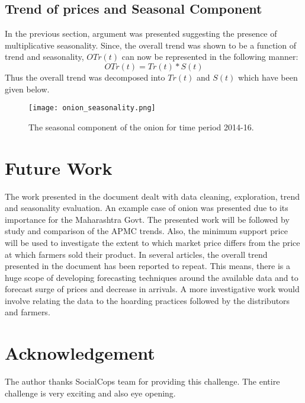 \documentclass{article}
\begin{document}
\subsection{Trend of prices and Seasonal Component}
In the previous section, argument was presented suggesting the presence of multiplicative seasonality. Since, the overall trend was shown to be a function of trend and seasonality, $OTr(t)$ can now be represented in the following manner:
\begin{equation}
	OTr(t) = Tr(t)*S(t)
\end{equation}
Thus the overall trend was decomposed into $Tr(t)$ and $S(t)$ which have been given below.

\begin{figure}

	\texttt{[image: onion\_seasonality.png]}
	\caption{The seasonal component of the onion for time period 2014-16. }
	\label{fig:onionseasonal}
\end{figure}
\section{Future Work}
The work presented in the document dealt with data cleaning, exploration, trend and seasonality evaluation. An example case of onion was presented due to its importance for the Maharashtra Govt. The presented work will be followed by study and comparison of the APMC trends. Also, the minimum support price will be used to investigate the extent to which market price differs from the price at which farmers sold their product. In several articles, the overall trend presented in the document has been reported to repeat. This means, there is a huge scope of developing forecasting techniques around the available data and to forecast surge of prices and decrease in arrivals. A more investigative work would involve relating the data to the hoarding practices followed by the distributors and farmers. 
\section{Acknowledgement} 
The author thanks SocialCops team for providing this challenge. The entire challenge is very exciting and also eye opening. 
\end{document}
